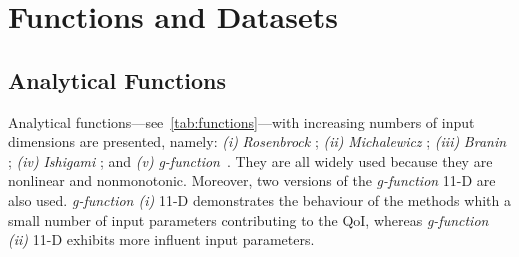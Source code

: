 
\chapter{Functions and Datasets}

\section{Analytical Functions}
\label{sec:functions}

Analytical functions---see~\cref{tab:functions}---with increasing numbers of input dimensions are presented, namely: \textit{(i)} \textit{Rosenbrock} ; \textit{(ii)} \textit{Michalewicz} ; \textit{(iii)} \textit{Branin} ; \textit{(iv)} \textit{Ishigami} ; and \textit{(v)} \textit{g-function}~\cite{molga2005,ishigami1990,saltelli2007,legratiet2016,forrester2008a}. They are all widely used because they are nonlinear and nonmonotonic. Moreover, two versions of the \emph{g-function} 11-D are also used. \textit{g-function (i)} 11-D demonstrates the behaviour of the methods whith a small number of input parameters contributing to the QoI, whereas \textit{g-function (ii)} 11-D exhibits more influent input parameters.

